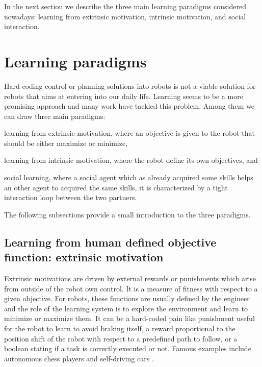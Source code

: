 
\transition

In the next section we describe the three main learning paradigms considered nowadays: learning from extrinsic motivation, intrinsic motivation, and social interaction.

\section{Learning paradigms}

Hard coding control or planning solutions into robots is not a viable solution for robots that aims at entering into our daily life. Learning seems to be a more promising approach and many work have tackled this problem. Among them we can draw three main paradigms: \begin{inparaenum}[(a)] \item learning from extrinsic motivation, where an objective is given to the robot that should be either maximize or minimize, \item learning from intrinsic motivation, where the robot define its own objectives, and \item social learning, where a social agent which as already acquired some skills helps an other agent to acquired the same skills, it is characterized by a tight interaction loop between the two partners. \end{inparaenum} The following subsections provide a small introduction to the three paradigms.

\subsection{Learning from human defined objective function: extrinsic motivation}

Extrinsic motivations are driven by external rewards or punishments which arise from outside of the robot own control. It is a measure of fitness with respect to a given objective. For robots, these functions are usually defined by the engineer and the role of the learning system is to explore the environment and learn to minimize or maximize them. It can be a hard-coded pain like punishment useful for the robot to learn to avoid braking itself, a reward proportional to the position shift of the robot with respect to a predefined path to follow, or a boolean stating if a task is correctly executed or not. Famous examples include autonomous chess players \cite{newborn1997kasparov} and self-driving cars \cite{montemerlo2008junior}.

